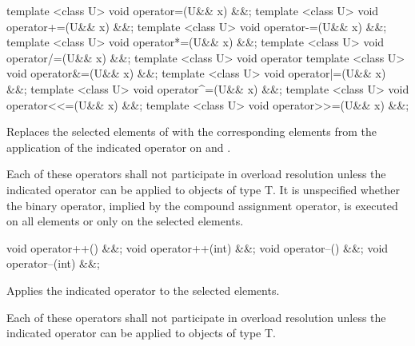 \begin{itemdecl}
template <class U> void operator=(U&& x) &&;
template <class U> void operator+=(U&& x) &&;
template <class U> void operator-=(U&& x) &&;
template <class U> void operator*=(U&& x) &&;
template <class U> void operator/=(U&& x) &&;
template <class U> void operator%
template <class U> void operator&=(U&& x) &&;
template <class U> void operator|=(U&& x) &&;
template <class U> void operator^=(U&& x) &&;
template <class U> void operator<<=(U&& x) &&;
template <class U> void operator>>=(U&& x) &&;
\end{itemdecl}
\begin{itemdescr}
  \pnum\effects
  Replaces the selected elements of  with the corresponding elements from the application of the indicated operator on  and .

  \pnum\remarks Each of these operators shall not participate in overload resolution unless the indicated operator can be applied to objects of type \type T.
  It is unspecified whether the binary operator, implied by the compound assignment operator, is executed on all elements or only on the selected elements.
\end{itemdescr}

\begin{itemdecl}
void operator++() &&;
void operator++(int) &&;
void operator--() &&;
void operator--(int) &&;
\end{itemdecl}
\begin{itemdescr}
  \pnum\effects Applies the indicated operator to the selected elements.

  \pnum\remarks Each of these operators shall not participate in overload resolution unless the indicated operator can be applied to objects of type \type T.
\end{itemdescr}

